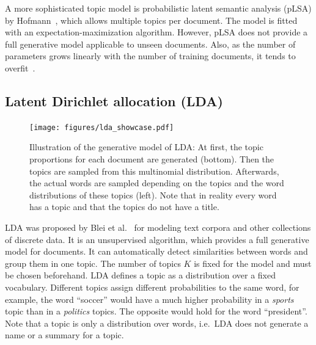 \documentclass[
        a4paper,
        titlepage,
        twoside,
        parskip,
        numbers=noenddot
        ]{scrbook}
\theoremstyle{break}
\begin{document}
A more sophisticated topic model is probabilistic latent semantic analysis (pLSA) by Hofmann~\cite{Hofmann1999}, which allows multiple topics per document.
The model is fitted with an expectation-maximization algorithm.
However, pLSA does not provide a full generative model applicable to unseen documents.
Also, as the number of parameters grows linearly with the number of training documents, it tends to overfit~\cite{Blei2003}.

\subsection{Latent Dirichlet allocation (LDA)}

\begin{figure}
       \centering
       \texttt{[image: figures/lda\_showcase.pdf]}
       \caption{Illustration of the generative model of LDA: At first, the topic proportions for each document are generated (bottom).
       Then the topics are sampled from this multinomial distribution.
       Afterwards, the actual words are sampled depending on the topics and the word distributions of these topics (left).
       Note that in reality every word has a topic and that the topics do not have a title.}
       \label{fig:lda_showcase}
\end{figure}

LDA was proposed by Blei et al.~\cite{Blei2003} for modeling text corpora and other collections of discrete data.
It is an unsupervised algorithm, which provides a full generative model for documents.
It can automatically detect similarities between words and group them in one topic.
The number of topics $K$ is fixed for the model and must be chosen beforehand.
LDA defines a topic as a distribution over a fixed vocabulary.
Different topics assign different probabilities to the same word, for example, the word ``soccer'' would have a much higher probability in a \emph{sports} topic than in a \emph{politics} topics.
The opposite would hold for the word ``president''.
Note that a topic is only a distribution over words, i.e.\ LDA does not generate a name or a summary for a topic.
\end{document}
